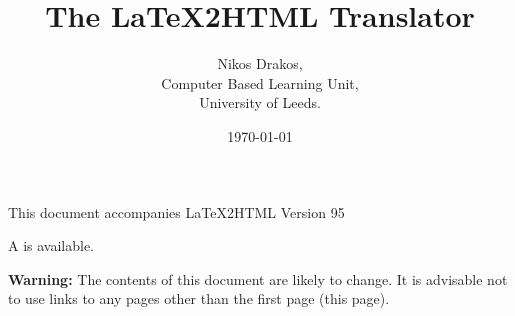


\makeindex
\newcommand{\latextohtml}{ {\bf LaTeX}{2}{\tt{HTML}} }
\newcommand{\fn}{\tt}	%
\newcommand{\indexentry}[2]
   {\item #1 #2}

\setlength{\textwidth}{5.5in}
\addtolength{\oddsidemargin}{-1in}
\addtolength{\evensidemargin}{-1in}

\sloppy
\title{The LaTeX2HTML Translator}
\author{Nikos Drakos,\\ Computer Based Learning Unit,\\ University of
Leeds.}
\date{\today}
\maketitle 

\centerline{This document accompanies LaTeX2HTML Version 95}

\begin{htmlonly}
A 
is available. 

{\bf Warning:} The contents of this document are likely to change.
It is advisable not to use links to any pages other than the first
page (this page).
\end{htmlonly}

